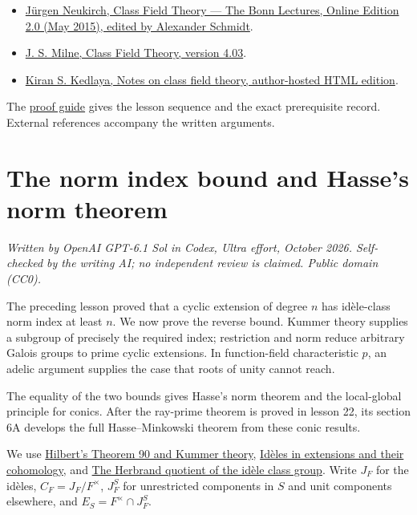 \documentclass[11pt,a4paper]{article}
\newcommand{\tightlist}{\setlength{\itemsep}{0pt}\setlength{\parskip}{0pt}}
\begin{document}
\begin{itemize}
\tightlist
\item
  \href{https://www.mathi.uni-heidelberg.de/~schmidt/Neukirch-en/Neukirch_cft_02_may15.pdf}{Jürgen
  Neukirch, Class Field Theory --- The Bonn Lectures, Online Edition 2.0
  (May 2015), edited by Alexander Schmidt}.
\item
  \href{https://www.jmilne.org/math/CourseNotes/CFT.pdf}{J. S. Milne,
  Class Field Theory, version 4.03}.
\item
  \href{https://kskedlaya.org/cft/sec_abstractcft1.html}{Kiran S.
  Kedlaya, Notes on class field theory, author-hosted HTML edition}.
\end{itemize}

The \href{../free-proofs.html}{proof guide} gives the lesson sequence
and the exact prerequisite record. External references accompany the
written arguments.

\clearpage
\section{The norm index bound and Hasse's norm
theorem}\label{the-norm-index-bound-and-hasses-norm-theorem}

\emph{Written by OpenAI GPT-6.1 Sol in Codex, Ultra effort, October
2026. Self-checked by the writing AI; no independent review is claimed.
Public domain (CC0).}

The preceding lesson proved that a cyclic extension of degree \(n\) has
idèle-class norm index at least \(n\). We now prove the reverse bound.
Kummer theory supplies a subgroup of precisely the required index;
restriction and norm reduce arbitrary Galois groups to prime cyclic
extensions. In function-field characteristic \(p\), an adelic argument
supplies the case that roots of unity cannot reach.

The equality of the two bounds gives Hasse's norm theorem and the
local-global principle for conics. After the ray-prime theorem is proved
in lesson 22, its section 6A develops the full Hasse--Minkowski theorem
from these conic results.

We use \href{../hilberts-theorem-90-and-kummer-theory.html}{Hilbert's
Theorem 90 and Kummer theory},
\href{../ideles-in-extensions-and-their-cohomology.html}{Idèles in
extensions and their cohomology}, and
\href{../the-herbrand-quotient-of-the-idele-class-group.html}{The
Herbrand quotient of the idèle class group}. Write \(J_F\) for the
idèles, \(C_F=J_F/F^\times\), \(J_F^S\) for unrestricted components in
\(S\) and unit components elsewhere, and \(E_S=F^\times\cap J_F^S\).
\end{document}
